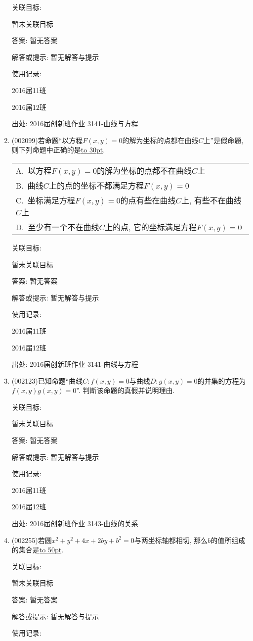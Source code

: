 \documentclass[10pt,a4paper]{article}
\newcommand{\blank}[1]{\underline{\hbox to #1pt{}}}
\newcommand{\onech}[4]{\par\begin{tabular}{p{.9\textwidth}}
A.~#1\\
B.~#2\\
C.~#3\\
D.~#4
\end{tabular}}
\begin{document}
\begin{enumerate}[1.]
关联目标:

暂未关联目标

答案: 暂无答案

解答或提示: 暂无解答与提示

使用记录:

2016届11班	

2016届12班	


出处: 2016届创新班作业	3141-曲线与方程
\item { (002099)}若命题``以方程$F(x,y)=0$的解为坐标的点都在曲线$C$上''是假命题, 则下列命题中正确的是\blank{30}.
\onech{以方程$F(x,y)=0$的解为坐标的点都不在曲线$C$上}
{曲线$C$上的点的坐标不都满足方程$F(x,y)=0$}
{坐标满足方程$F(x,y)=0$的点有些在曲线$C$上, 有些不在曲线$C$上}
{至少有一个不在曲线$C$上的点, 它的坐标满足方程$F(x,y)=0$}


关联目标:

暂未关联目标

答案: 暂无答案

解答或提示: 暂无解答与提示

使用记录:

2016届11班	

2016届12班	


出处: 2016届创新班作业	3141-曲线与方程
\item { (002123)}已知命题``曲线$C:f(x,y)=0$与曲线$D:g(x,y)=0$的并集的方程为$f(x,y)g(x,y)=0$''. 判断该命题的真假并说明理由.


关联目标:

暂未关联目标

答案: 暂无答案

解答或提示: 暂无解答与提示

使用记录:

2016届11班	

2016届12班	


出处: 2016届创新班作业	3143-曲线的关系
\item { (002255)}若圆$x^2+y^2+4x+2by+b^2=0$与两坐标轴都相切, 那么$b$的值所组成的集合是\blank{50}.


关联目标:

暂未关联目标

答案: 暂无答案

解答或提示: 暂无解答与提示

使用记录:


\end{enumerate}
\end{document}

